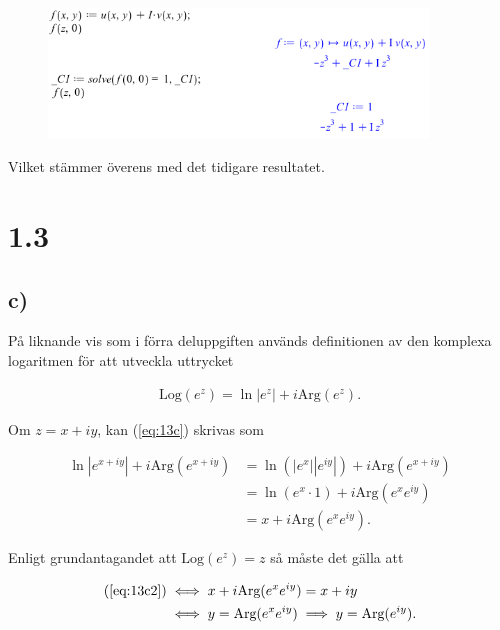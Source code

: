 \documentclass[a4paper]{article}
\begin{document}
\begin{figure}[h!]
	\centering
	\includegraphics[width=0.9\textwidth]{maple_11_4.png}
\end{figure}

Vilket stämmer överens med det tidigare resultatet.

\section*{1.3}
\subsection*{c)}

%

På liknande vis som i förra deluppgiften används definitionen av den komplexa logaritmen för att utveckla uttrycket

\begin{align}
	\text{Log}(e^z) = \ln|e^z| + i\text{Arg}(e^z).\label{eq:13c}
\end{align}

Om $z = x + iy$, kan (\ref{eq:13c}) skrivas som

\begin{align}
	\ln|e^{x+iy}| + i\text{Arg}(e^{x+iy}) &= \ln(|e^x||e^{iy}|) + i\text{Arg}(e^{x+iy})\\
										  &= \ln(e^x\cdot1) + i\text{Arg}(e^xe^{iy})\\
			   &= x + i\text{Arg}(e^xe^{iy}).\label{eq:13c2}
\end{align}

Enligt grundantagandet att $\text{Log}(e^z) = z$ så måste det gälla att

\begin{align*}
	(\ref{eq:13c2}) &\iff x + i\text{Arg}(e^xe^{iy}) = x + iy\\
					&\iff y = \text{Arg}(e^xe^{iy}) \implies y = \text{Arg}(e^{iy}).
\end{align*}
\end{document}
